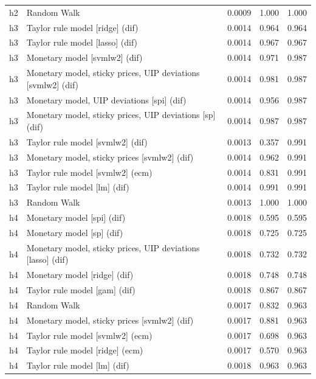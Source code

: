 \begin{ThreePartTable}
\begin{longtable}[t]{cp{5.5cm}ccc}
h2 & \raggedright Random Walk & 0.0009 & 1.000 & 1.000\\
\addlinespace
h3 & \raggedright Taylor rule model [ridge] (dif) & 0.0014 & 0.964 & 0.964\\
h3 & \raggedright Taylor rule model [lasso] (dif) & 0.0014 & 0.967 & 0.967\\
h3 & \raggedright Monetary model [svmlw2] (dif) & 0.0014 & 0.971 & 0.987\\
h3 & \raggedright Monetary model, sticky prices, UIP deviations [svmlw2] (dif) & 0.0014 & 0.981 & 0.987\\
h3 & \raggedright Monetary model, UIP deviations [spi] (dif) & 0.0014 & 0.956 & 0.987\\
h3 & \raggedright Monetary model, sticky prices, UIP deviations [sp] (dif) & 0.0014 & 0.987 & 0.987\\
h3 & \raggedright Taylor rule model [svmlw2] (dif) & 0.0013 & 0.357 & 0.991\\
h3 & \raggedright Monetary model, sticky prices [svmlw2] (dif) & 0.0014 & 0.962 & 0.991\\
h3 & \raggedright Taylor rule model [svmlw2] (ecm) & 0.0014 & 0.831 & 0.991\\
h3 & \raggedright Taylor rule model [lm] (dif) & 0.0014 & 0.991 & 0.991\\
h3 & \raggedright Random Walk & 0.0013 & 1.000 & 1.000\\
\addlinespace
h4 & \raggedright Monetary model [spi] (dif) & 0.0018 & 0.595 & 0.595\\
h4 & \raggedright Monetary model [sp] (dif) & 0.0018 & 0.725 & 0.725\\
h4 & \raggedright Monetary model, sticky prices, UIP deviations [lasso] (dif) & 0.0018 & 0.732 & 0.732\\
h4 & \raggedright Monetary model [ridge] (dif) & 0.0018 & 0.748 & 0.748\\
h4 & \raggedright Taylor rule model [gam] (dif) & 0.0018 & 0.867 & 0.867\\
h4 & \raggedright Random Walk & 0.0017 & 0.832 & 0.963\\
h4 & \raggedright Monetary model, sticky prices [svmlw2] (dif) & 0.0017 & 0.881 & 0.963\\
h4 & \raggedright Taylor rule model [svmlw2] (ecm) & 0.0017 & 0.698 & 0.963\\
h4 & \raggedright Taylor rule model [ridge] (ecm) & 0.0017 & 0.570 & 0.963\\
h4 & \raggedright Taylor rule model [lm] (dif) & 0.0018 & 0.963 & 0.963\\

\end{longtable}
\end{ThreePartTable}
